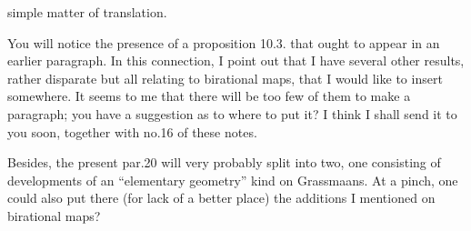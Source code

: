 
simple matter of translation.

You will notice the presence of a proposition 10.3. that ought to
appear in an earlier paragraph. In this connection, I point out that I have
several other results, rather disparate but all relating to
birational maps, that I would like to insert somewhere.
It seems to me that there will be too few of them to make a paragraph; 
you have a suggestion as to where to put it? I think I shall send it to you
soon, together with no.16 of these notes.

Besides, the present par.20 will very probably split into
two, one consisting of developments of an ``elementary geometry''
kind on Grassmaans. At a pinch, one could also put there
(for lack of a better place) the additions I mentioned on
birational maps?


